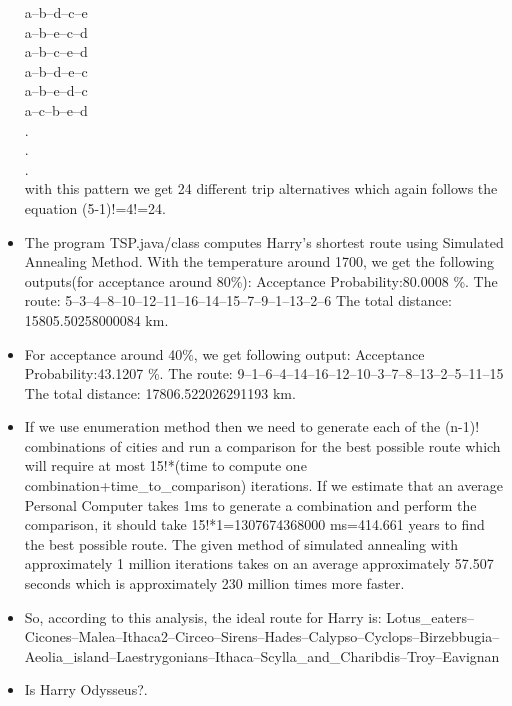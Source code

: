 \documentclass[a4paper,10pt]{report}
\begin{document}
\begin{itemize}
        a--b--d--c--e\\
        a--b--e--c--d\\
        a--b--c--e--d\\
        a--b--d--e--c\\
        a--b--e--d--c\\
        a--c--b--e--d\\
        .\\
        .\\
        .\\
with this pattern we get 24 different trip alternatives which again follows the equation (5-1)!=4!=24.
\item The program TSP.java/class computes Harry's shortest route using Simulated Annealing Method. With the temperature around 1700, we get the following outputs(for acceptance around 80\%):
Acceptance Probability:80.0008 \%.
The route:
5--3--4--8--10--12--11--16--14--15--7--9--1--13--2--6
The total distance: 15805.50258000084 km.


\item For acceptance around 40\%, we get following output:
Acceptance Probability:43.1207 \%.
The route:
9--1--6--4--14--16--12--10--3--7--8--13--2--5--11--15
The total distance: 17806.522026291193 km.

\item If we use enumeration method then we need to generate each of the (n-1)! combinations of cities and run a comparison for the best possible route which will require at most 15!*(time to compute one combination+time\_to\_comparison) iterations. If we estimate that an average Personal Computer takes 1ms to generate a combination and perform the comparison, it should take  15!*1=1307674368000 ms=414.661 years to find the best possible route. The given method of simulated annealing with approximately 1 million iterations takes on an average approximately 57.507 seconds which is approximately 230 million times more faster.
\item So, according to this analysis, the ideal route for Harry is: Lotus\_eaters--Cicones--Malea--Ithaca2--Circeo--Sirens--Hades--Calypso--Cyclops--Birzebbugia--Aeolia\_island--Laestrygonians--Ithaca--Scylla\_and\_Charibdis--Troy--Eavignan
\item Is Harry Odysseus?.

\end{itemize}
\end{document}

